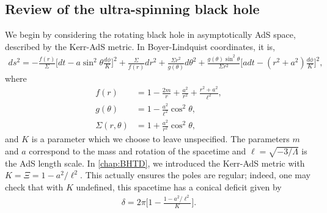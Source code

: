 \documentclass[
twoside,
openright,
frontopenright,
]{dmathesis}
\newcommand{\nn}{\nonumber}
\begin{document}

\subsection{Review of the ultra-spinning black hole}

We begin by considering the rotating black hole in asymptotically AdS space,
described by the Kerr-AdS metric. In Boyer-Lindquist coordinates, it is, 
\begin{align} \label{eq:kerrAdS}
ds^2 = -\frac{f(r)}{\Sigma}\Big[dt-a\sin^2\theta \frac{d\phi}{K} \Big]^2 +
  \frac{\Sigma}{f(r)}dr^2 + \frac{\Sigma r^2}{g(\theta)}d\theta^2 +
  \frac{g(\theta) \sin^2\theta}{\Sigma r^2} \Big[adt-(r^2+a^2)
  \frac{d\phi}{K}\Big]^2, 
\end{align}
where
\begin{align}
f(r)&= 1-\frac{2 m}{r}+\frac{a^2}{r^2}+\frac{r^2+a^2}{\ell^2},\nn\\
g(\theta)&=1 - \frac{a^2}{\ell^2} \cos^2\theta, \nn\\
\Sigma(r, \theta) &= 1 + \frac{a^2}{r^2} \cos^2\theta,
\end{align}
and $K$ is a parameter which we choose to leave unspecified. The parameters $m$
and $a$ correspond to the mass and rotation of the spacetime and
$\ell = \sqrt{-3/\Lambda}$ is the AdS length scale. In \cref{chap:BHTD}, we
introduced the Kerr-AdS metric with $K = \Xi = 1-a^2/\ell^2$. This actually ensures
the poles are regular; indeed, one may check that with $K$ undefined, this
spacetime has a conical deficit given by
\begin{align}\label{eq:deficit-al}
\delta = 2\pi \bigg[1-\frac{1-a^{2}/\ell^{2}}{K}\bigg].
\end{align}
\end{document}
